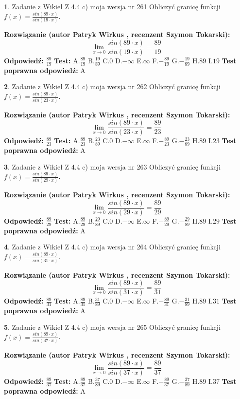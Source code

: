 \documentclass[12pt, a4paper]{article}
\theoremstyle{definition} %
\newtheorem{zad}{}
\newcommand{\zadStart}[1]{\begin{zad}#1\newline}
\newcommand{\zadStop}{\end{zad}}
\newcommand{\rozwStart}[2]{\noindent \textbf{Rozwiązanie (autor #1 , recenzent #2): }\newline}
\newcommand{\rozwStop}{\newline}
\newcommand{\odpStart}{\noindent \textbf{Odpowiedź:}\newline}
\newcommand{\odpStop}{\newline}
\newcommand{\testStart}{\noindent \textbf{Test:}\newline}
\newcommand{\testStop}{\newline}
\newcommand{\kluczStart}{\noindent \textbf{Test poprawna odpowiedź:}\newline}
\newcommand{\kluczStop}{\newline}
\begin{document}
\zadStart{Zadanie z Wikieł Z 4.4 c) moja wersja nr 261}
Obliczyć granicę funkcji $f(x)=\frac{sin(89\cdot x)}{sin(19\cdot x)}$.
\zadStop
\rozwStart{Patryk Wirkus}{Szymon Tokarski}
$$\lim\limits_{x\to 0}\frac{sin(89\cdot x)}{sin(19\cdot x)}=
\frac{89}{19}$$
\rozwStop
\odpStart
$\frac{89}{19}$
\odpStop
\testStart
A.$\frac{89}{19}$
B.$\frac{19}{89}$
C.$0$
D.$-\infty$
E.$\infty$
F.$-\frac{89}{19}$
G.$-\frac{19}{89}$
H.$89$
I.$19$
\testStop
\kluczStart
A
\kluczStop



\zadStart{Zadanie z Wikieł Z 4.4 c) moja wersja nr 262}
Obliczyć granicę funkcji $f(x)=\frac{sin(89\cdot x)}{sin(23\cdot x)}$.
\zadStop
\rozwStart{Patryk Wirkus}{Szymon Tokarski}
$$\lim\limits_{x\to 0}\frac{sin(89\cdot x)}{sin(23\cdot x)}=
\frac{89}{23}$$
\rozwStop
\odpStart
$\frac{89}{23}$
\odpStop
\testStart
A.$\frac{89}{23}$
B.$\frac{23}{89}$
C.$0$
D.$-\infty$
E.$\infty$
F.$-\frac{89}{23}$
G.$-\frac{23}{89}$
H.$89$
I.$23$
\testStop
\kluczStart
A
\kluczStop



\zadStart{Zadanie z Wikieł Z 4.4 c) moja wersja nr 263}
Obliczyć granicę funkcji $f(x)=\frac{sin(89\cdot x)}{sin(29\cdot x)}$.
\zadStop
\rozwStart{Patryk Wirkus}{Szymon Tokarski}
$$\lim\limits_{x\to 0}\frac{sin(89\cdot x)}{sin(29\cdot x)}=
\frac{89}{29}$$
\rozwStop
\odpStart
$\frac{89}{29}$
\odpStop
\testStart
A.$\frac{89}{29}$
B.$\frac{29}{89}$
C.$0$
D.$-\infty$
E.$\infty$
F.$-\frac{89}{29}$
G.$-\frac{29}{89}$
H.$89$
I.$29$
\testStop
\kluczStart
A
\kluczStop



\zadStart{Zadanie z Wikieł Z 4.4 c) moja wersja nr 264}
Obliczyć granicę funkcji $f(x)=\frac{sin(89\cdot x)}{sin(31\cdot x)}$.
\zadStop
\rozwStart{Patryk Wirkus}{Szymon Tokarski}
$$\lim\limits_{x\to 0}\frac{sin(89\cdot x)}{sin(31\cdot x)}=
\frac{89}{31}$$
\rozwStop
\odpStart
$\frac{89}{31}$
\odpStop
\testStart
A.$\frac{89}{31}$
B.$\frac{31}{89}$
C.$0$
D.$-\infty$
E.$\infty$
F.$-\frac{89}{31}$
G.$-\frac{31}{89}$
H.$89$
I.$31$
\testStop
\kluczStart
A
\kluczStop



\zadStart{Zadanie z Wikieł Z 4.4 c) moja wersja nr 265}
Obliczyć granicę funkcji $f(x)=\frac{sin(89\cdot x)}{sin(37\cdot x)}$.
\zadStop
\rozwStart{Patryk Wirkus}{Szymon Tokarski}
$$\lim\limits_{x\to 0}\frac{sin(89\cdot x)}{sin(37\cdot x)}=
\frac{89}{37}$$
\rozwStop
\odpStart
$\frac{89}{37}$
\odpStop
\testStart
A.$\frac{89}{37}$
B.$\frac{37}{89}$
C.$0$
D.$-\infty$
E.$\infty$
F.$-\frac{89}{37}$
G.$-\frac{37}{89}$
H.$89$
I.$37$
\testStop
\kluczStart
A
\kluczStop
\end{document}
